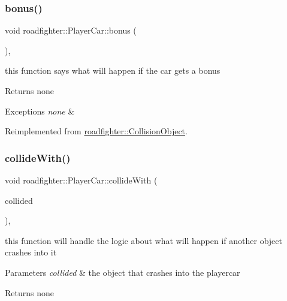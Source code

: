 \subsubsection{\texorpdfstring{bonus()}{bonus()}}
{\footnotesize\ttfamily void roadfighter\+::\+Player\+Car\+::bonus (\begin{DoxyParamCaption}{ }\end{DoxyParamCaption})\hspace{0.3cm}{\ttfamily [override]}, {\ttfamily [virtual]}}

this function says what will happen if the car gets a bonus \begin{DoxyReturn}{Returns}
none 
\end{DoxyReturn}

\begin{DoxyExceptions}{Exceptions}
{\em none} & \\
\hline
\end{DoxyExceptions}


Reimplemented from \hyperlink{classroadfighter_1_1CollisionObject_ad35887bb3cfb8c054eaaee56306d6944}{roadfighter\+::\+Collision\+Object}.

\mbox{\label{classroadfighter_1_1PlayerCar_ab62e40d949ac12f402fdaaab15c69b81}} 
\subsubsection{\texorpdfstring{collide\+With()}{collideWith()}}
{\footnotesize\ttfamily void roadfighter\+::\+Player\+Car\+::collide\+With (\begin{DoxyParamCaption}\item[{std\+::shared\+\_\+ptr$<$ \hyperlink{classroadfighter_1_1CollisionObject}{Collision\+Object} $>$ \&}]{collided }\end{DoxyParamCaption})\hspace{0.3cm}{\ttfamily [override]}, {\ttfamily [virtual]}}

this function will handle the logic about what will happen if another object crashes into it 
\begin{DoxyParams}{Parameters}
{\em collided} & the object that crashes into the playercar \\
\hline
\end{DoxyParams}
\begin{DoxyReturn}{Returns}
none 
\end{DoxyReturn}

